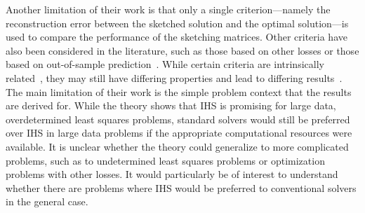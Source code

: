 Another limitation of their work is that only a single criterion---namely the reconstruction error between the sketched solution and the optimal solution---is used to compare the performance of the sketching matrices. Other criteria have also been considered in the literature, such as those based on other losses or those based on out-of-sample prediction~\citep{Dobriban:2019,Pilanci:2016}. While certain criteria are intrinsically related~\citep{Drineas:2011}, they may still have differing properties and lead to differing results~\citep{Dobriban:2019}.
\\

The main limitation of their work is the simple problem context that the results are derived for. While the theory shows that IHS is promising for large data, overdetermined least squares problems, standard solvers would still be preferred over IHS in large data problems if the appropriate computational resources were available. It is unclear whether the theory could generalize to more complicated problems, such as to undetermined least squares problems or optimization problems with other losses. It would particularly be of interest to understand whether there are problems where IHS would be preferred to conventional solvers in the general case.